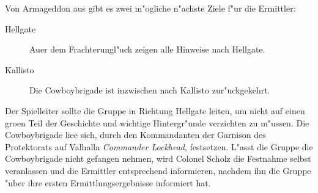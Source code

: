 
Von Armageddon aus gibt es zwei m"ogliche n"achste Ziele f"ur die Ermittler:

\begin{description}
	\item [Hellgate] Au\3er dem Frachterungl"uck zeigen alle Hinweise nach Hellgate.
	\item [Kallisto] Die Cowboybrigade ist inzwischen nach Kallisto zur"uckgekehrt.
\end{description}

Der Spielleiter sollte die Gruppe in Richtung Hellgate leiten, um nicht auf einen gro\3en Teil der Geschichte und wichtige Hintergr"unde verzichten zu m"ussen. Die Cowboybrigade lie\3e sich, durch den Kommandanten der Garnison des Protektorats auf Valhalla \textit{Commander Lockhead}, festsetzen. L"asst die Gruppe die Cowboybrigade nicht gefangen nehmen, wird Colonel Scholz die Festnahme selbst veranlassen und die Ermittler entsprechend informieren, nachdem ihn die Gruppe "uber ihre ersten Ermittlungsergebnisse informiert hat.
